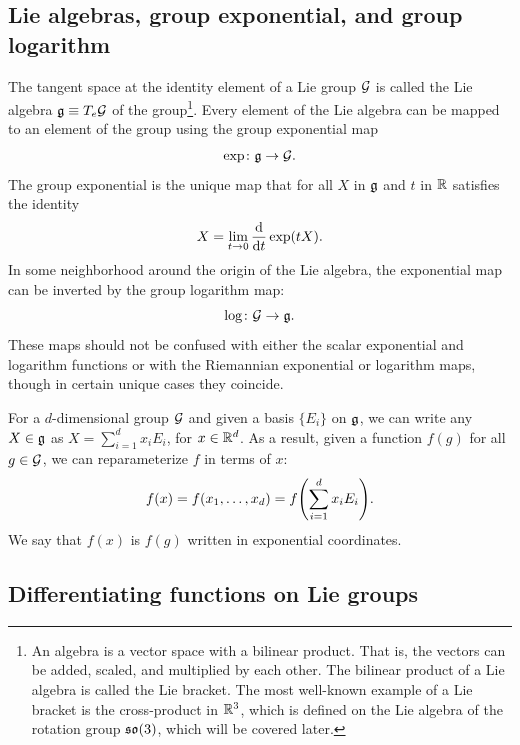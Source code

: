 \documentclass[../../main.tex]{subfiles}
\begin{document}
\begin{refsection}
	\subsection{Lie algebras, group exponential, and group logarithm}\label{lie-algebras-group-exponential-and-group-logarithm}

	The tangent space at the identity element of a Lie group $\mathcal{G}$ is called the Lie algebra $\mathfrak{g} \equiv T_e \mathcal{G}$ of the group\footnote{
		An algebra is a vector space with a bilinear product.
		That is, the vectors can be added, scaled, and multiplied by each other.
		The bilinear product of a Lie algebra is called the Lie bracket.
		The most well-known example of a Lie bracket is the cross-product in $\mathbb{R}^3$, which is defined on the Lie algebra of the rotation group $\mathfrak{so} (3)$, which will be covered later.}.
	Every element of the Lie algebra can be mapped to an element of the group using the group exponential map
	$$\exp \colon \mathfrak{g} \to \mathcal{G}.$$
	The group exponential is the unique map that for all $X$ in $\mathfrak{g}$ and $t$ in $\mathbb{R}$ satisfies the identity
	\begin{equation}\label{expmapdef}
		X = \lim_{t \to 0} \dv{t} \exp(t X).
	\end{equation}
	In some neighborhood around the origin of the Lie algebra, the exponential map can be inverted by the group logarithm map:
	\[\log \colon \mathcal{G} \to \mathfrak{g}.\]
	These maps should not be confused with either the scalar exponential and logarithm functions or with the Riemannian exponential or logarithm maps, though in certain unique cases they coincide.

	For a $d$-dimensional group $\mathcal{G}$ and given a basis $\{E_i\}$ on $\mathfrak{g}$, we can write any $X \in \mathfrak{g}$ as $X = \sum_{i=1}^d x_i E_i$, for $x \in \mathbb{R}^d$.
	As a result, given a function $f(g)$ for all $g \in \mathcal{G}$, we can reparameterize $f$ in terms of $x$:
	$$f(x) = f(x_1, \ldots, x_d) = f\qty(\sum_{i=1}^d x_i E_i).$$
	We say that $f(x)$ is $f(g)$ written in exponential coordinates.

	\subsection{Differentiating functions on Lie groups}


\end{refsection}
\end{document}
